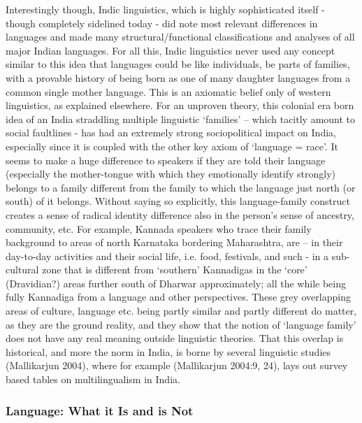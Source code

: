 Interestingly though, Indic linguistics, which is highly sophisticated itself - though completely sidelined today - did note most relevant differences in languages and made many structural/functional classifications and analyses of all major Indian languages. For all this, Indic linguistics never used any concept similar to this idea that languages could be like individuals, be parts of families, with a provable history of being born as one of many daughter languages from a common single mother language. This is an axiomatic belief only of western linguistics, as explained elsewhere. For an unproven theory, this colonial era born idea of an India straddling multiple linguistic ‘families’ – which tacitly amount to social faultlines - has had an extremely strong sociopolitical impact on India, especially since it is coupled with the other key axiom of ‘language = race’. It seems to make a huge difference to speakers if they are told their language (especially the mother-tongue with which they emotionally identify strongly) belongs to a family different from the family to which the language just north (or south) of it belongs. Without saying so explicitly, this language-family construct creates a sense of radical identity difference also in the person’s sense of ancestry, community, etc. For example, Kannada speakers who trace their family background to areas of north Karnataka bordering Maharashtra, are – in their day-to-day activities and their social life, i.e. food, festivals, and such - in a sub-cultural zone that is different from ‘southern’ Kannadigas in the ‘core’ (Dravidian?) areas further south of Dharwar approximately; all the while being fully Kannadiga from a language and other perspectives. These grey overlapping areas of culture, language etc. being partly similar and partly different do matter, as they are the ground reality, and they show that the notion of ‘language family’ does not have any real meaning outside linguistic theories. That this overlap is historical, and more the norm in India, is borne by several linguistic studies (Mallikarjun 2004), where for example (Mallikarjun 2004:9, 24), lays out survey based tables on multilingualism in India.


\subsubsection*{Language: What it Is and is Not}

